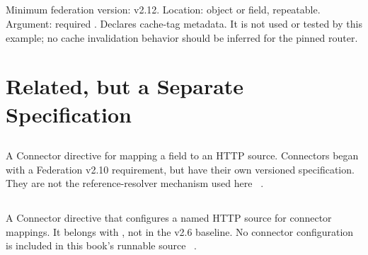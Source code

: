 \subsection*{}

Minimum federation version: v2.12. Location: object or field, repeatable.
Argument: required . Declares cache-tag metadata.
It is not used or tested by this example; no cache invalidation behavior
should be inferred for the pinned router.

\section{Related, but a Separate Specification}

\subsection*{}

A Connector directive for mapping a field to an HTTP source. Connectors
began with a Federation v2.10 requirement, but have their own versioned
specification. They are not the reference-resolver mechanism used here
~\autocite{apolloconnectorsrepair}.

\subsection*{}

A Connector directive that configures a named HTTP source for connector
mappings. It belongs with , not in the v2.6 baseline.
No connector configuration is included in this book's runnable source
~\autocite{apolloconnectorsrepair}.
